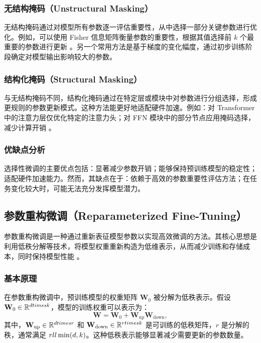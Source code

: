 \documentclass[12pt,a4paper,twoside]{article} %
\begin{document}
\begin{multicols}{2}
\subsubsection{无结构掩码（Unstructural Masking）}
无结构掩码通过对模型所有参数逐一评估重要性，从中选择一部分关键参数进行优化。例如，可以使用 Fisher 信息矩阵衡量参数的重要性，根据其值选择前 $k$ 个最重要的参数进行更新 \cite{fisher_information}。另一个常用方法是基于梯度的变化幅度，通过初步训练阶段确定对模型输出影响较大的参数。

\subsubsection{结构化掩码（Structural Masking）}
与无结构掩码不同，结构化掩码通过在特定层或模块中对参数进行分组选择，形成更规则的参数更新模式。这种方法能更好地适配硬件加速。例如：对 Transformer 中的注意力层仅优化特定的注意力头；对 FFN 模块中的部分节点应用掩码选择，减少计算开销 \cite{structural_masking}。

\subsubsection{优缺点分析}
选择性微调的主要优点包括：显著减少参数开销；能够保持预训练模型的稳定性；适配硬件加速能力。然而，其缺点在于：依赖于高效的参数重要性评估方法；在任务变化较大时，可能无法充分发挥模型潜力。

\subsection{参数重构微调（Reparameterized Fine-Tuning）}

参数重构微调是一种通过重新表征模型参数以实现高效微调的方法。其核心思想是利用低秩分解等技术，将模型权重重新构造为低维表示，从而减少训练和存储成本，同时保持模型性能 \cite{han2024peft}。

\subsubsection{基本原理}
在参数重构微调中，预训练模型的权重矩阵 $\mathbf{W}_0$ 被分解为低秩表示。假设 $\mathbf{W}_0 \in \mathbb{R}^{d \\times k}$，模型的训练权重可以表示为：
\begin{equation}
\mathbf{W} = \mathbf{W}_0 + \mathbf{W}_{\text{up}} \mathbf{W}_{\text{down}},
\label{eq:reparameterized}
\end{equation}
其中，$\mathbf{W}_{\text{up}} \in \mathbb{R}^{d \\times r}$ 和 $\mathbf{W}_{\text{down}} \in \mathbb{R}^{r \\times k}$ 是可训练的低秩矩阵，$r$ 是分解的秩，通常满足 $r \\ll \min(d, k)$。这种低秩表示能够显著减少需要更新的参数数量。


\end{multicols}
\end{document}
